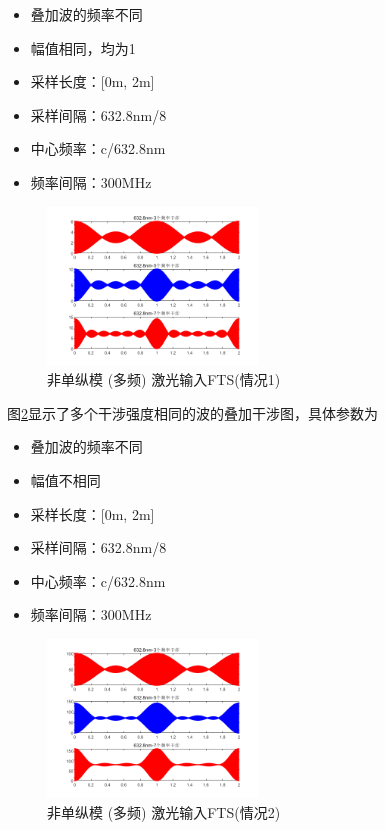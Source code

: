 \documentclass[conference]{IEEEtran}
\begin{document}
\begin{itemize}
    \item 叠加波的频率不同
    \item 幅值相同，均为1
    \item  采样长度：[0m, 2m]
    \item 采样间隔：632.8nm/8
    \item 中心频率：c/632.8nm
    \item 频率间隔：300MHz
\end{itemize}
\begin{figure}[htbp]
    \centerline{\includegraphics[width=0.5\textwidth]{pic4.png}}
    \caption{非单纵模 (多频) 激光输入FTS(情况1)}
    \label{pic4}
\end{figure}
图\ref{pic5}显示了多个干涉强度相同的波的叠加干涉图，具体参数为
\begin{itemize}
    \item 叠加波的频率不同
    \item 幅值不相同
    \item  采样长度：[0m, 2m]
    \item 采样间隔：632.8nm/8
    \item 中心频率：c/632.8nm
    \item 频率间隔：300MHz
\end{itemize}
\begin{figure}[htbp]
    \centerline{\includegraphics[width=0.5\textwidth]{pic5.png}}
    \caption{非单纵模 (多频) 激光输入FTS(情况2)}
    \label{pic5}
\end{figure}
\end{document}

